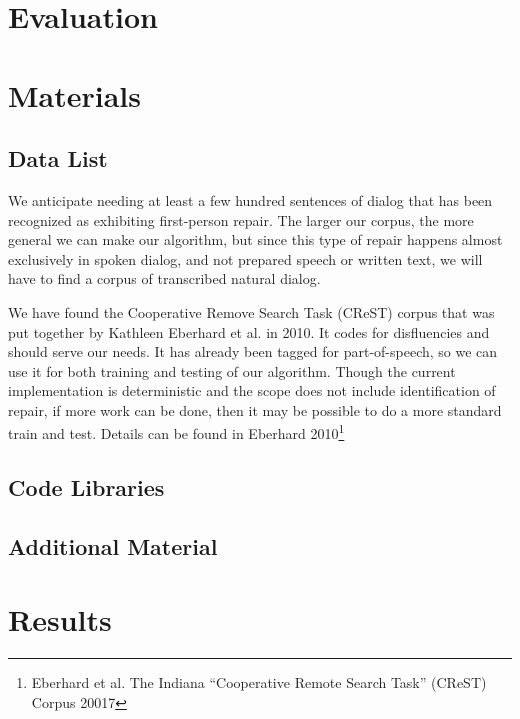 \documentclass{article}
\begin{document}
\section{Evaluation}



\section{Materials}
\subsection{Data List}
We anticipate needing at least a few hundred sentences of dialog that has been recognized as exhibiting first-person repair. The larger our corpus, the more general we can make our algorithm, but since this type of repair happens almost exclusively in spoken dialog, and not prepared speech or written text, we will have to find a corpus of transcribed natural dialog.

We have found the Cooperative Remove Search Task (CReST) corpus that was put together by Kathleen Eberhard et al. in 2010. It codes for disfluencies and should serve our needs. It has already been tagged for part-of-speech, so we can use it for both training and testing of our algorithm. Though the current implementation is deterministic and the scope does not include identification of repair, if more work can be done, then it may be possible to do a more standard train and test. Details can be found in Eberhard 2010\footnote{Eberhard et al. The Indiana ``Cooperative Remote Search Task'' (CReST) Corpus 20017}

\subsection{Code Libraries}



\subsection{Additional Material}

\section{Results}
\end{document}

